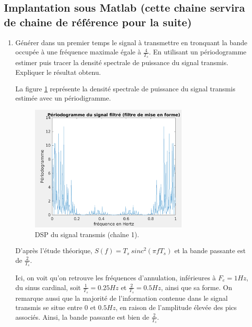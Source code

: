 \documentclass[frenchb]{article}
\begin{document}
\subsection{Implantation sous Matlab (cette chaine servira de chaine de référence pour la suite)}
    \begin{enumerate}
        \item Générer dans un premier temps le signal à transmettre en tronquant la bande occupée à une fréquence maximale égale à $\frac{4}{T_s}$. En utilisant un périodogramme estimer puis tracer la densité spectrale de puissance du signal transmis. Expliquer le résultat obtenu.
        
        \par\leavevmode\par
        \setlength\parindent{0.5cm}
        La figure \ref{fig : C1F42} représente la densité spectrale de puissance du signal transmis estimée avec un périodigramme.
        
        \newpage
        \begin{figure}[ht!]
		\centering
		\includegraphics[width=8cm]{C1F42.png}		\caption{DSP du signal transmis (chaîne 1). \label{fig : C1F42}}
		\end{figure}
		
	    D'après l'étude théorique, $ S(f)  = T_s \ sinc^2(\pi f T_s) $ et la bande passante est de $\frac{2}{T_s}$. 
	    
	    Ici, on voit qu'on retrouve les fréquences d'annulation, inférieures à $F_e = 1 Hz$, du sinus cardinal, soit $\frac{1}{T_s} = 0.25 Hz$ et $\frac{2}{T_s} = 0.5 Hz$, ainsi que sa forme. On remarque aussi que la majorité de l'information contenue dans le signal transmis se situe entre $0$ et $0.5 Hz$, en raison de l'amplitude élevée des pics associés. Ainsi, la bande passante est bien de $\frac{2}{T_s}$.
	    \par\leavevmode\par
		

\end{enumerate}
\end{document}
